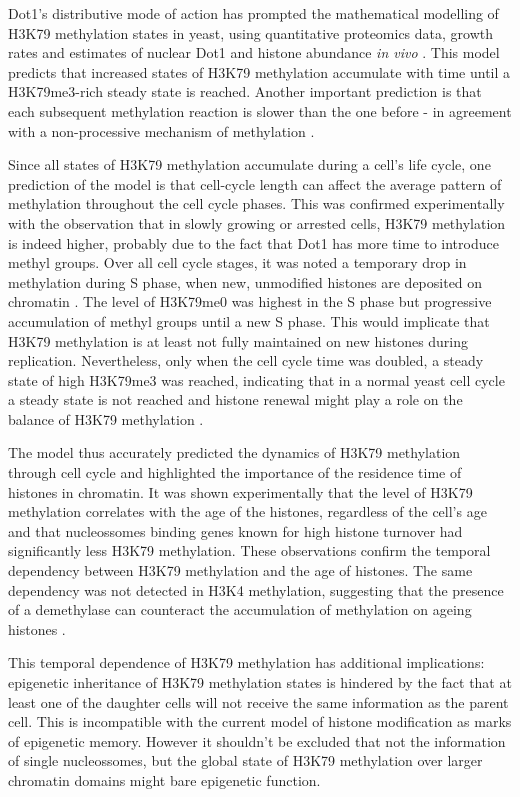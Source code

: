 \documentclass[11pt,twoside,a4paper]{report}
\begin{document}
		Dot1's distributive mode of action has prompted the mathematical modelling of H3K79 methylation states in yeast, using quantitative proteomics data, growth rates and estimates of nuclear Dot1 and histone abundance \textit{in vivo} \cite{DeVos2011}. This model predicts that increased states of H3K79 methylation accumulate with time until a H3K79me3-rich steady state is reached. Another important prediction is that each subsequent methylation reaction is slower than the one before - in agreement with a non-processive mechanism of methylation \cite{DeVos2011}.
			
		Since all states of H3K79 methylation accumulate during a cell's life cycle, one prediction of the model is that cell-cycle length can affect the average pattern of methylation throughout the cell cycle phases. This was confirmed experimentally with the observation that in slowly growing or arrested cells, H3K79 methylation is indeed higher, probably due to the fact that Dot1 has more time to introduce methyl groups. Over all cell cycle stages, it was noted a temporary drop in methylation during S phase, when new, unmodified histones are deposited on chromatin \cite{DeVos2011}. The level of H3K79me0 was highest in the S phase but progressive accumulation of methyl groups until a new S phase. This would implicate that H3K79 methylation is at least not fully maintained on new histones during replication. Nevertheless, only when the cell cycle time was doubled, a steady state of high H3K79me3 was reached, indicating that in a normal yeast cell cycle a steady state is not reached and histone renewal might play a role on the balance of H3K79 methylation \cite{DeVos2011}.
		
		The model thus accurately predicted the dynamics of H3K79 methylation through cell cycle and highlighted the importance of the residence time of histones in chromatin.	It was shown experimentally that the level of H3K79 methylation correlates with the age of the histones, regardless of the cell's age and that nucleossomes binding genes known for high histone turnover had significantly less H3K79 methylation. These observations confirm the temporal dependency between H3K79 methylation and the age of histones. The same dependency was not detected in H3K4 methylation, suggesting that the presence of a demethylase can counteract the accumulation of methylation on ageing histones \cite{DeVos2011}.
		
		This temporal dependence of H3K79 methylation has additional implications: epigenetic inheritance of H3K79 methylation states is hindered by the fact that at least one of the daughter cells will not receive the same information as the parent cell. This is incompatible with the current model of histone modification as marks of epigenetic memory. However it shouldn't be excluded that not the information of single nucleossomes, but the global state of H3K79 methylation over larger chromatin domains might bare epigenetic function.
		
\end{document}

